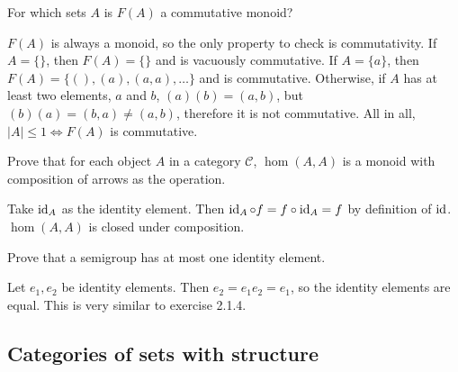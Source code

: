 \begin{exercise}
    For which sets \(A\) is \(F(A)\) a commutative monoid?
\end{exercise}
\begin{solution}
    \(F(A)\) is always a monoid, so the only property to check is commutativity. If \(A = \{\}\), then \(F(A) = \{\}\) and is vacuously commutative. If \(A = \{a\}\), then \(F(A) = \{(), (a), (a, a), \dots\}\) and is commutative. Otherwise, if \(A\) has at least two elements, \(a\) and \(b\), \((a)(b) = (a, b)\), but \((b)(a) = (b, a) \neq (a, b)\), therefore it is not commutative. All in all, \(|A| \leq 1 \Leftrightarrow F(A)\) is commutative.
\end{solution}
\begin{exercise}
    Prove that for each object \(A\) in a category \(\mathcal{C}\), \(\hom(A, A)\) is a monoid with composition of arrows as the operation.
\end{exercise}
\begin{solution}
    Take \(\operatorname{id}_A\) as the identity element. Then \(\operatorname{id}_A \circ f = f \circ \operatorname{id}_A = f\) by definition of \(\operatorname{id}\). \(\hom(A, A)\) is closed under composition.
\end{solution}
\begin{exercise}
    Prove that a semigroup has at most one identity element.
\end{exercise}
\begin{solution}
    Let \(e_1, e_2\) be identity elements. Then \(e_2 = e_1 e_2 = e_1\), so the identity elements are equal. This is very similar to exercise 2.1.4.
\end{solution}

\subsection{Categories of sets with structure}

